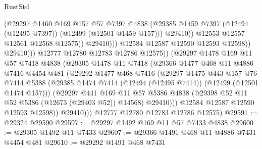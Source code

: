 \begin{lexlean}{RustStd}
\begin{coremodule}
{\begin{coremodule}
{{{{{{{{{{{{{{{{{{{{{{{{{{{{{{{{{{{{{{{{{{{{{{{{{{{{{{{{{{{{{{{{{{{{{{{{{{{{{{{{                                    (@29297
                                      @1460
                                      @169
                                      @157
                                      @57
                                      @7397
                                      @4838
                                      (@29385
                                        @1459
                                        @7397
                                        (@12494 (@12495 @7397))
                                        (@12499 (@12501 @1459 @157)))
                                      @29410))
                                  @12553
                                  @12557
                                  @12561
                                  @12568
                                  @12575))
                              @29410)))
                        @12584
                        @12587
                        @12590
                        @12593
                        @12598))
                    @29410)))
              @12777
              @12780
              @12783
              @12786
              @12575))
          (@29297
            @1478
            @169
            @11
            @57
            @7418
            @4838
            (@29305
              @1478
              @11
              @7418
              (@29366
                @1477
                @468
                @11
                @4886
                @7416
                @4454
                @481
                (@29292
                  @1477
                  @468
                  @7416
                  (@29297
                    @1475
                    @443
                    @157
                    @76
                    @7414
                    @5388
                    (@29385 @1474 @7414 (@12494 (@12495 @7414)) (@12499 (@12501 @1474 @157)))
                    (@29297
                      @441
                      @169
                      @11
                      @57
                      @5386
                      @4838
                      (@29398 @52 @11 @52 @5386 (@12673 (@29403 @52)) @14568)
                      @29410)))
                @12584
                @12587
                @12590
                @12593
                @12598))
            @29410)))
      @12777
      @12780
      @12783
      @12786
      @12575)
@29591 := @29324 @29590
@29597 := @29297 @1492 @169 @11 @57 @7433 @4838
@29600 := @29305 @1492 @11 @7433
@29607 := @29366 @1491 @468 @11 @4886 @7431 @4454 @481
@29610 := @29292 @1491 @468 @7431
}}}}}}}}}}}}}}}}}}}}}}}}}}}}}}}}}}}}}}}}}}}}}}}}}}}}}}}}}}}}}}}}}}}}}}}}}}}}}}}}
\end{coremodule}}
\end{coremodule}
\end{lexlean}
